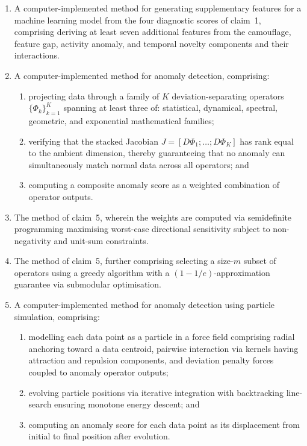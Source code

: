 \documentclass[12pt,a4paper]{article}
\begin{document}
\begin{enumerate}[label=\textbf{\arabic*.}, leftmargin=2em]
\item A computer-implemented method for generating supplementary features for
a machine learning model from the four diagnostic scores of claim~1, comprising
deriving at least seven additional features from the camouflage, feature gap,
activity anomaly, and temporal novelty components and their interactions.

\item A computer-implemented method for anomaly detection, comprising:
\begin{enumerate}[label=(\alph*)]
  \item projecting data through a family of $K$ deviation-separating operators
    $\{\Phi_k\}_{k=1}^K$ spanning at least three of: statistical, dynamical,
    spectral, geometric, and exponential mathematical families;
  \item verifying that the stacked Jacobian
    $J = [D\Phi_1; \ldots; D\Phi_K]$ has rank equal to the ambient dimension,
    thereby guaranteeing that no anomaly can simultaneously match normal data
    across all operators; and
  \item computing a composite anomaly score as a weighted combination of
    operator outputs.
\end{enumerate}

\item The method of claim~5, wherein the weights are computed via semidefinite
programming maximising worst-case directional sensitivity subject to
non-negativity and unit-sum constraints.

\item The method of claim~5, further comprising selecting a size-$m$ subset of
operators using a greedy algorithm with a $(1-1/e)$-approximation guarantee
via submodular optimisation.

\item A computer-implemented method for anomaly detection using particle
simulation, comprising:
\begin{enumerate}[label=(\alph*)]
  \item modelling each data point as a particle in a force field comprising
    radial anchoring toward a data centroid, pairwise interaction via kernels
    having attraction and repulsion components, and deviation penalty forces
    coupled to anomaly operator outputs;
  \item evolving particle positions via iterative integration with
    backtracking line-search ensuring monotone energy descent; and
  \item computing an anomaly score for each data point as its displacement
    from initial to final position after evolution.
\end{enumerate}


\end{enumerate}
\end{document}

